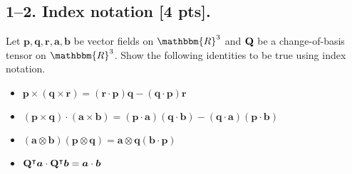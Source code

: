 \bigskip
\subsection*{1--2. \textbf{Index notation} [4 pts].} Let $\bm{p}, \bm{q}, \bm{r}, \bm{a}, \bm{b}$ be vector fields on $\mathbbm{R}^3$ and $\mathbf{Q}$ be a change-of-basis tensor on $\mathbbm{R}^3$. Show the following identities to be true using index notation. 

\begin{itemize}
    \item $\bm{p} \times (\bm{q} \times \bm{r}) = (\bm{r} \cdot \bm{p}) \bm{q} - (\bm{q} \cdot \bm{p}) \bm{r}$
    \item $(\bm{p} \times \bm{q}) \cdot (\bm{a} \times \bm{b}) = (\bm{p} \cdot \bm{a}) (\bm{q} \cdot \bm{b}) - (\bm{q} \cdot \bm{a})(\bm{p} \cdot \bm{b})$
    \item $(\bm{a} \otimes \bm{b})(\bm{p} \otimes \bm{q}) = \bm{a}\otimes\bm{q}(\bm{b} \cdot \bm{p}) $
    \item $\mathbf{Q}^\intercal\bm{a} \cdot \mathbf{Q}^\intercal\bm{b} = \bm{a}\cdot\bm{b} $
\end{itemize}


